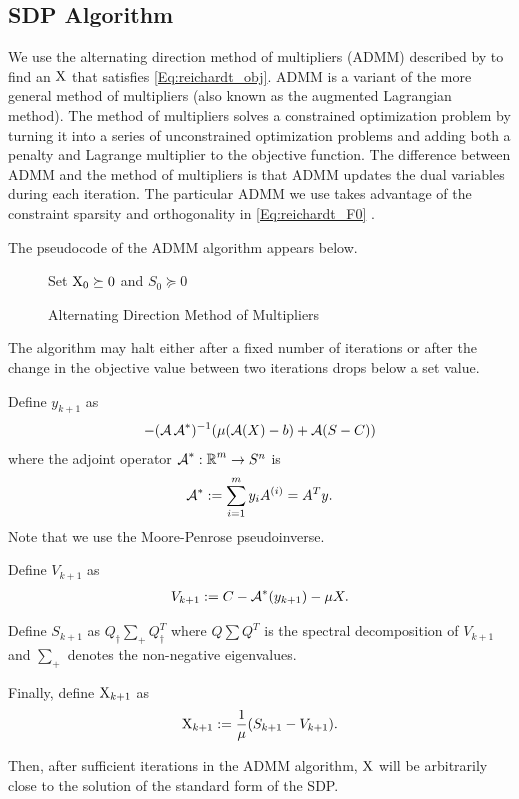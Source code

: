 \subsection{SDP Algorithm}

We use the alternating direction method of multipliers (ADMM)
described by \cite{adm} to find an $\operatorname{X}$ that satisfies
\cref{Eq:reichardt_obj}.
ADMM is a variant
of the more general method of multipliers (also known
as the augmented Lagrangian method).
The method of multipliers solves a constrained optimization
problem by turning it into a series of unconstrained optimization
problems and adding both a penalty and Lagrange multiplier 
to the objective function.
The difference between ADMM and the method of multipliers
is that ADMM updates the dual variables during each iteration.
The particular ADMM we use takes advantage of the constraint sparsity
and orthogonality in \cref{Eq:reichardt_F0} \cite{adm}.

The pseudocode of the ADMM algorithm appears below.
\begin{figure}[h]
\begin{algorithm2e}[H]
    \SetAlgoLined
    Set $\operatorname{X}_0 \succeq 0$ and $S_0 \succeq 0$ \\
    \caption{Alternating Direction Method of Multipliers
    \cite{adm}}
\end{algorithm2e}
\end{figure}

The algorithm may halt either after a fixed number of
iterations or after the change in the objective value
between two iterations drops below a set value.

Define $y_{k+1}$ as
\begin{align}
    -(\operatorname{\mathcal{A}} \operatorname{\mathcal{A}}^*)^{-1} (\mu (\operatorname{\mathcal{A}}(X) - b) + \operatorname{\mathcal{A}}(S-C))
    \nonumber
\end{align}
where the adjoint operator $\operatorname{\mathcal{A}}^*:\operatorname{\mathbb{R}}^m \rightarrow S^n$ is
\begin{align}
    \operatorname{\mathcal{A}}^* := \sum_{i=1}^m y_i A^{(i)} = A^T y.
    \nonumber
\end{align}
Note that we use the Moore-Penrose pseudoinverse.

Define $V_{k+1}$ as
\begin{align}
    V_{k+1} := C - \operatorname{\mathcal{A}}^*(y_{k+1}) - \mu X.
    \nonumber
\end{align}

Define $S_{k+1}$ as $Q_\dagger \sum_+ Q_\dagger^T$
where $Q \sum Q^T$ is the spectral decomposition
of $V_{k+1}$ and $\sum_+$ denotes the non-negative eigenvalues.

Finally, define $\operatorname{X}_{k+1}$ as
\begin{align}
    \operatorname{X}_{k+1} := \frac{1}{\mu}(S_{k+1} - V_{k+1}).
    \nonumber
\end{align}

Then, after sufficient iterations in the ADMM algorithm,
$\operatorname{X}$ will be arbitrarily close to the solution
of the standard form of the SDP.
